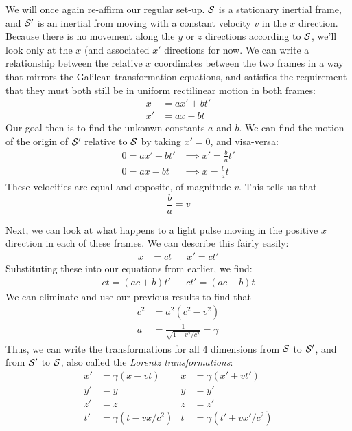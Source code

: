 \documentclass[a4paper]{article}
\begin{document}
We will once again re-affirm our regular set-up. $\S$ is a stationary
inertial frame, and $\S'$ is an inertial from moving with a constant
velocity $v$ in the $x$ direction. Because there is no movement along the
$y$ or $z$ directions according to $\S$, we'll look only at the $x$
(and associated $x'$ directions for now. We can write a relationship between
the relative $x$ coordinates between the two frames in a way that mirrors the
Galilean transformation equations, and satisfies the requirement that they
must both still be in uniform rectilinear motion in both frames:
\begin{align*}
	x &= ax' + bt'\\
	x' &= ax - bt
\end{align*}
Our goal then is to find the unkonwn constants $a$ and $b$. We can find the
motion of the origin of $\S'$ relative to $\S$ by taking $x'=0$, and
visa-versa:
\begin{align*}
	0 = ax' + bt' &\implies x' = \frac{b}{a}t'\\
	0 = ax-bt &\implies x = \frac{b}{a}t
\end{align*}
These velocities are equal and opposite, of magnitude $v$. This tells us that
\[ \frac{b}{a} = v \]

Next, we can look at what happens to a light pulse moving in the positive
$x$ direction in each of these frames. We can describe this fairly
easily:
\begin{align*}
	x &= ct &&
	x' = ct'
\end{align*}
Substituting these into our equations from earlier, we find:
\begin{align*}
	ct = (ac+b)t' &&
	ct' = (ac-b)t
\end{align*}
We can eliminate and use our previous results to find that
\begin{align*}
	c^2 &= a^2(c^2-v^2)\\
	a &= \frac{1}{\sqrt{1-v^2/c^2}} = \gamma
\end{align*}
Thus, we can write the transformations for all 4 dimensions from $\S$ to
$\S'$, and from $\S'$ to $\S$, also called the \emph{Lorentz transformations}:
\begin{align*}
	x' &= \gamma(x-vt) & x &= \gamma(x'+vt')\\
	y' &= y & y &= y'\\
	z' &= z & z &= z'\\
	t' &= \gamma(t-vx/c^2) & t &= \gamma(t'+vx'/c^2)
\end{align*}
\end{document}
